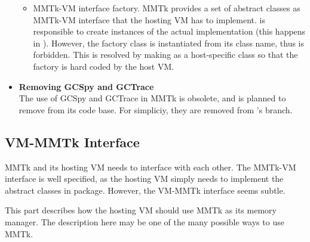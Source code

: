 \documentclass[12pt]{article}
\begin{document}
\begin{itemize}
\begin{itemize}
  \item MMTk-VM interface factory. 
  MMTk provides a set of abstract classes as MMTk-VM interface that 
  the hosting VM has to implement. 
  is responsible to create instances of the actual implementation (this
  happens in ). 
  However, the factory class is instantiated from its class name, thus
  is forbidden. This is resolved by making 
   as a host-specific class so 
  that the factory is hard coded by the host VM. 
  \end{itemize}

\item
\textbf{Removing GCSpy and GCTrace\\}
The use of GCSpy and GCTrace in MMTk is obsolete, and is planned to
remove from its code base. For simpliciy, 
they are removed from \rjc 's branch. 

\end{itemize}

\subsection{VM-MMTk Interface}

MMTk and its hosting VM needs to interface with each other. 
The MMTk-VM interface is well specified, as the hosting VM
simply needs to implement the abstract classes in
 package. However, the VM-MMTk
interface seems subtle. 

This part describes how the hosting VM should
use MMTk as its memory manager. The description here
may be one of the many possible ways to use MMTk. 
\end{document}
